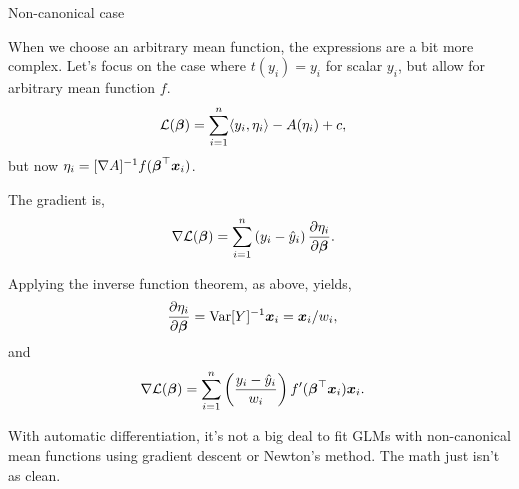 \documentclass[aspectratio=169]{beamer}
\begin{document}
\begin{frame}[t,allowframebreaks]{Non-canonical case}\label{non-canonical-case}

When we choose an arbitrary mean function, the expressions are a bit
more complex. Let's focus on the case where \(t(y_i) = y_i\) for scalar
\(y_i\), but allow for arbitrary mean function \(f\). \begin{align*}
    \mathcal{L}(\boldsymbol{\beta}) 
    &= \sum_{i=1}^n \langle y_i, \eta_i \rangle - A(\eta_i)  + c,
\end{align*} but now
\(\eta_i = [\nabla A]^{-1} f(\boldsymbol{\beta}^\top \boldsymbol{x}_i)\).

The gradient is, \begin{align*}
    \nabla \mathcal{L}(\boldsymbol{\beta}) 
    &= \sum_{i=1}^n \left(y_i - \hat{y}_i\right) \frac{\partial \eta_i}{\partial \boldsymbol{\beta}}.
\end{align*}

Applying the inverse function theorem, as above, yields, \begin{align*}
\frac{\partial \eta_i}{\partial \boldsymbol{\beta}} 
&= \mathrm{Var}[Y]^{-1} \boldsymbol{x}_i = \boldsymbol{x}_i / w_i,
\end{align*} and \begin{align*}
    \nabla \mathcal{L}(\boldsymbol{\beta}) 
    &= \sum_{i=1}^n \left(\frac{y_i - \hat{y}_i}{w_i} \right) f'(\boldsymbol{\beta}^\top \boldsymbol{x}_i) \boldsymbol{x}_i.
\end{align*}

With automatic differentiation, it's not a big deal to fit GLMs with non-canonical mean functions using gradient descent or Newton's method. 
The math just isn't as clean.

\end{frame}
\end{document}
